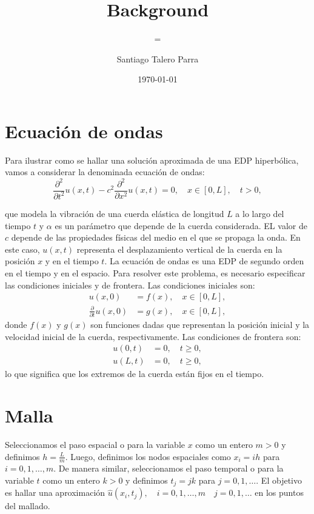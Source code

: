 \documentclass{replab}
\title{Background}
\subtitle={Diferencias Finitas - Ecuación de Onda 1D}
\author{Santiago Talero Parra}
\date{\today}
\begin{document}
\pagestyle{fancy}
\unspacedoperators
\begin{center}
    \maketitle{\hrulefill}
\end{center}


\section*{Ecuación de ondas}
Para ilustrar como se hallar una solución aproximada de una EDP hiperbólica, vamos a considerar la denominada ecuación de ondas:
\begin{equation*}
	\frac{\partial^2}{\partial t^2}u(x,t) - c^2 \frac{\partial^2}{\partial x^2}u(x,t) = 0, \quad x \in [0,L], \quad t > 0,
\end{equation*}

que modela la vibración de una cuerda elástica de longitud $L$ a lo largo del tiempo $t$ y $\alpha$ es un parámetro que depende de la cuerda considerada. EL valor de $c$ depende de las propiedades físicas del medio en el que se propaga la onda. En este caso, $u(x,t)$ representa el desplazamiento vertical de la cuerda en la posición $x$ y en el tiempo $t$. La ecuación de ondas es una EDP de segundo orden en el tiempo y en el espacio. Para resolver este problema, es necesario especificar las condiciones iniciales y de frontera. Las condiciones iniciales son:
\begin{align*}
	u(x,0) &= f(x), \quad x \in [0,L], \\
	\frac{\partial}{\partial t}u(x,0) &= g(x), \quad x \in [0,L],
\end{align*}
donde $f(x)$ y $g(x)$ son funciones dadas que representan la posición inicial y la velocidad inicial de la cuerda, respectivamente. Las condiciones de frontera son:
\begin{align*}
	u(0,t) &= 0, \quad t \geq 0, \\
	u(L,t) &= 0, \quad t \geq 0,
\end{align*}
lo que significa que los extremos de la cuerda están fijos en el tiempo.

\section*{Malla}

Seleccionamos el paso espacial o para la variable $x$ como un entero $m > 0$ y definimos $h = \frac{L}{m}$. Luego, definimos los nodos espaciales como $x_i = ih$ para $i = 0, 1, \ldots, m$. De manera similar, seleccionamos el paso temporal o para la variable $t$ como un entero $k > 0$ y definimos $t_j = jk$ para $j = 0, 1, \ldots$. El objetivo es hallar una aproximación $\hat{u}(x_i,t_j), \quad i=0,1, \ldots, m \quad j=0,1, \ldots$ en los puntos del mallado. 
\end{document}
